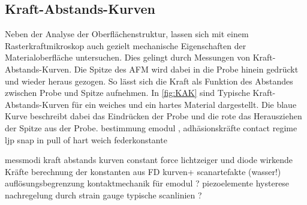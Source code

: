 \subsection{Kraft-Abstands-Kurven}
Neben der Analyse der Oberflächenstruktur, lassen sich mit einem Rasterkraftmikroskop auch gezielt mechanische Eigenschaften der Materialoberfläche untersuchen. Dies gelingt durch Messungen von Kraft-Abstands-Kurven. Die Spitze des AFM wird dabei in die Probe hinein gedrückt und wieder heraus gezogen. So lässt sich die Kraft als Funktion des Abstandes zwischen Probe und Spitze aufnehmen.
In \autoref{fig:KAK} sind Typische Kraft-Abstands-Kurven für ein weiches und ein hartes Material dargestellt. Die blaue Kurve beschreibt dabei das Eindrücken der Probe und die rote das Herausziehen der Spitze aus der Probe.
bestimmung emodul , adhäsionskräfte
contact regime ljp
snap in pull of
hart weich
federkonstante




messmodi
kraft abstands kurven
constant force
lichtzeiger und diode
wirkende Kräfte
berechnung der konstanten aus FD kurven+
scanartefakte (wasser!)
auflösungsbegrenzung
kontaktmechanik für emodul ?
piezoelemente
hysterese nachregelung durch strain gauge
typische scanlinien ?

